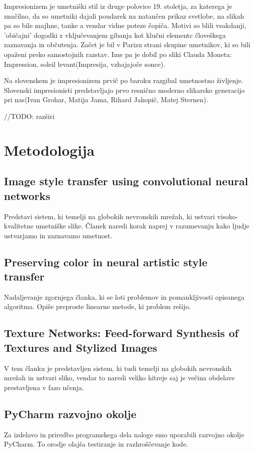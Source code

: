 \documentclass[a4paper, 12pt]{book}
\begin{document}
Impresionizem je umetniški stil iz druge polovice 19. stoletja, za katerega je značilno, da so umetniki dajali poudarek na natančen prikaz svetlobe, na slikah pa so bile majhne, tanke a vendar vidne poteze čopiča. Motivi so blili vsakdanji, 'običajni' dogodki z vključevanjem gibanja kot klučni elementc človeškega zaznavanja in občutenja.
Začet je bil v Parizu strani skupine umetnikov, ki so bili opaženi preko samostojnih razstav. Ime pa je dobil po sliki Clauda Moneta: Impression, soleil levant(Impresija, vzhajajoče sonce).


Na slovenskem je impresionizem prvič po baroku razgibal umetnostno življenje. Slovenski impresionisti predstavljajo prvo resnično moderno slikarsko generacijo pri nas(Ivan Grohar, Matija Jama, Rihard Jakopič, Matej Sternen).

//TODO: razširi


\chapter{Metodologija}
\label{metode}

\section{Image style transfer using convolutional neural networks}
 Predstavi sistem, ki temelji na globokih nevronskih mrežah, ki ustvari visoko-kvalitetne umetniške slike. Članek naredi korak naprej v razumevanju kako ljudje ustvarjamo in zaznavamo umetnost.\cite{gatys2016image}


\section{Preserving color in neural artistic style transfer} Nadaljevanje zgornjega članka, ki se loti problemov in pomankljivosti opisanega algoritma. Opiše preproste linearne metode, ki problem rešijo.\cite{gatys2016preserving}


\section{Texture Networks: Feed-forward Synthesis of Textures and Stylized Images}
V tem članku je predstavljen sistem, ki tudi temelji na globokih nevronskih mrežah in ustvari sliko, vendar to naredi veliko hitreje saj je večina obdelave prestavljena v fazo učenja.\cite{ulyanov2016texture}


\section{PyCharm razvojno okolje}
Za izdelavo in priredbo programskega dela naloge smo uporabili razvojno okolje PyCharm. To orodje olajša testiranje in razhroščevanje kode.
\end{document}
